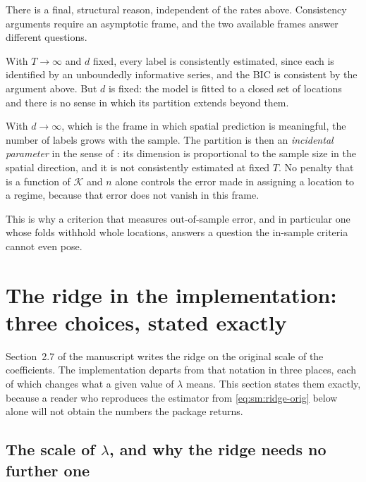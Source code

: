 \documentclass[11pt]{article}
\begin{document}
There is a final, structural reason, independent of the rates above. Consistency arguments require an asymptotic frame, and the two available frames answer different questions.

With $T \to \infty$ and $d$ fixed, every label is consistently estimated, since each is identified by an unboundedly informative series, and the BIC is consistent by the argument above. But $d$ is fixed: the model is fitted to a closed set of locations and there is no sense in which its partition extends beyond them.

With $d \to \infty$, which is the frame in which spatial prediction is meaningful, the number of labels grows with the sample. The partition is then an \emph{incidental parameter} in the sense of \citet{NeymanScott1948}: its dimension is proportional to the sample size in the spatial direction, and it is not consistently estimated at fixed $T$. No penalty that is a function of $\mathcal{K}$ and $n$ alone controls the error made in assigning a location to a regime, because that error does not vanish in this frame.

This is why a criterion that measures out-of-sample error, and in particular one whose folds withhold whole locations, answers a question the in-sample criteria cannot even pose.

\section{The ridge in the implementation: three choices, stated exactly}\label{sm:lambda}

Section~2.7 of the manuscript writes the ridge on the original scale of the coefficients. The implementation departs from that notation in three places, each of which changes what a given value of $\lambda$ means. This section states them exactly, because a reader who reproduces the estimator from \eqref{eq:sm:ridge-orig} below alone will not obtain the numbers the package returns.

\subsection{The scale of \texorpdfstring{$\lambda$}{lambda}, and why the ridge needs no further one}
\end{document}
